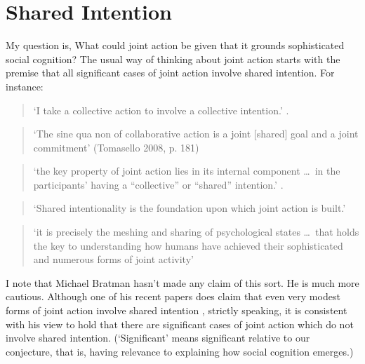 \documentclass[12pt,a4paper]{extarticle}
\begin{document}
\section{Shared Intention}
My question is, What could joint action be given that it grounds sophisticated social cognition?
The usual way of thinking about joint action starts with the premise that all significant cases of joint action involve shared intention.  For instance:  
%
\begin{quote} 
`I take a collective action to involve a collective intention.'  \citep[p.\ 5]{Gilbert:2006wr}.
\end{quote}
%
\begin{quote} 
`The sine qua non of collaborative action is a joint [shared] goal and a joint commitment’ 
(Tomasello 2008, p. 181)
\end{quote} 
%
%
\begin{quote}
`the key property of joint action lies in its internal component \ldots \ in the participants’ having a ``collective'' or ``shared'' intention.' \citep[pp. 444-5]{alonso_shared_2009}.
\end{quote}
%
\begin{quote}
`Shared intentionality is the foundation upon which joint action is built.' \citep[p.\ 381]{Carpenter:2009wq}
\end{quote}
%
\begin{quote}
`it is precisely the meshing and sharing of psychological states \ldots \ that holds the key to understanding how humans have achieved their sophisticated and numerous forms of joint activity'
\citep[p.\ 369]{Call:2009fk}
\end{quote}

I note that Michael Bratman hasn't made any claim of this sort.
He is much more cautious.
Although one of his recent papers does claim that even very modest forms of joint action involve shared intention \citep{Bratman:2009lv},
strictly speaking, it is consistent with his view to hold that there are significant cases of joint action which do not involve shared intention.  
(`Significant' means significant relative to our conjecture, that is, having relevance to explaining how social cognition emerges.)
\begin{comment}
And in `Acting over Time, Acting Together' he is explicit about this caution:
%
\begin{quote}
`I ...\ do not mean to claim that the exercise of planning capacities is the only possible form of temporally extended or shared intentional activity. My conjecture concerns important forms of ...\ small scale shared intentional activity, without being a claim to uniqueness.' 
\citep[p.\ 3]{Bratman:2011fk}
\end{quote}
\end{comment}
\end{document}
